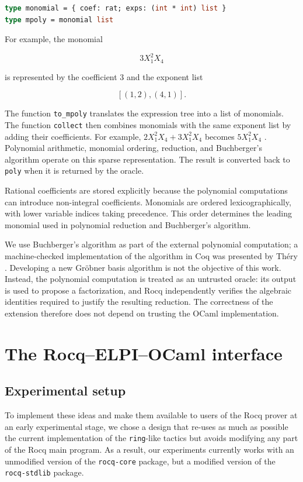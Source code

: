 \documentclass[11pt]{article}
\begin{document}
\begin{lstlisting}[language=ML]
type monomial = { coef: rat; exps: (int * int) list }
type mpoly = monomial list
\end{lstlisting}

For example, the monomial

$$
  3X_1^2X_4
$$

is represented by the coefficient $3$ and the exponent list

$$
  [(1,2),(4,1)].
$$

The function \texttt{to\_mpoly} translates the expression tree into a list of monomials. The function \texttt{collect} then combines monomials with the same exponent list by adding their coefficients.
For example, $2X_1^2X_4 + 3X_1^2X_4$ becomes $5X_1^2X_4$ .
Polynomial arithmetic, monomial ordering, reduction, and Buchberger's
algorithm operate on this sparse representation. The result is converted back
to \texttt{poly} when it is returned by the oracle.

Rational coefficients are stored explicitly because the polynomial
computations can introduce non-integral coefficients. Monomials are ordered
lexicographically, with lower variable indices taking precedence. This order
determines the leading monomial used in polynomial reduction and
Buchberger's algorithm.


We use Buchberger's algorithm as part of the external polynomial computation; a machine-checked implementation of the algorithm in Coq was presented by Théry \cite{thery2001machine}. Developing a new Gröbner basis algorithm is not the objective of this work. Instead, the polynomial computation is treated as an untrusted oracle: its output is used to propose a factorization, and Rocq independently verifies the algebraic identities required to justify the resulting reduction. The correctness of the extension therefore does not depend on trusting the OCaml implementation.


\section{The Rocq--ELPI--OCaml interface}
\subsection{Experimental setup}
To implement these ideas and make them available to users of the Rocq
prover at an early experimental stage, we chose a design that re-uses as
much as possible the current implementation of the {\tt ring}-like
tactics but avoids modifying
any part of the Rocq main program.  As a result, our experiments
currently works with an unmodified version of the {\tt rocq-core}
package, but a modified version of the {\tt rocq-stdlib} package.
\end{document}
